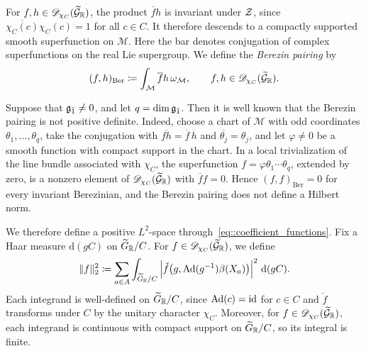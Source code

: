 For $f,h\in\mathscr D_{\chi_C}(\widetilde{{\mathcal{G}}}_{{\mathbb R}})$,
the product $\overline f h$ is invariant under ${\mathcal{Z}}$, since
$
\overline{\chi_C(c)}\chi_C(c)=1$ for all $c\in C$.
It therefore descends to a compactly supported smooth
superfunction on $\mathcal M$. Here the bar denotes conjugation
of complex superfunctions on the real Lie supergroup. We define
the \emph{Berezin pairing} by
\begin{equation}
\label{eq::Berezin_L2_pairing}
(f,h)_{\mathrm{Ber}}
\coloneqq
\int_{\mathcal M}
\overline f h\,\omega_{\mathcal M},
\qquad
f,h\in\mathscr D_{\chi_C}(\widetilde{{\mathcal{G}}}_{{\mathbb R}}).
\end{equation}

Suppose that ${\mathfrak{g}_{\bar{1}}}\neq0$, and let $q=\dim{\mathfrak{g}_{\bar{1}}}$. Then it is well known that the Berezin pairing is not positive definite. Indeed, choose a chart of $\mathcal M$ with odd coordinates $\theta_1,\ldots,\theta_q$, take the conjugation with $\overline{fh}=\overline{f}\,\overline{h}$ and $\overline{\theta_j}=\theta_j$, and let $\varphi\neq0$ be a smooth function with compact support in the chart. In a local trivialization of the line bundle associated with $\chi_C$, the superfunction $f=\varphi\theta_1\cdots\theta_q$, extended by zero, is a nonzero element of $\mathscr D_{\chi_C}(\widetilde{{\mathcal{G}}}_{{\mathbb R}})$ with $\overline{f}f=0$. Hence $(f,f)_{\mathrm{Ber}}=0$ for every invariant Berezinian, and the Berezin pairing does not define a Hilbert norm.

We therefore define a positive $L^2$-space through~\eqref{eq::coefficient_functions}. Fix a Haar measure $\mathrm{d}(gC)$ on $\widetilde{G}_{{\mathbb R}}/C$. For $f\in\mathscr D_{\chi_C}(\widetilde{{\mathcal{G}}}_{{\mathbb R}})$, we define
\begin{equation}
\label{eq::positive_super_L2_right}
\|f\|_2^2
\coloneqq
\sum_{a\in A}
\int_{\widetilde{G}_{{\mathbb R}}/C}
\left|
\check f\bigl(g,\operatorname{Ad}(g^{-1})\beta(X_{a})\bigr)
\right|^2\,\mathrm{d}(gC).
\end{equation}
Each integrand is well-defined on $\widetilde{G}_{{\mathbb R}}/C$, since $\operatorname{Ad}(c)=\operatorname{id}$ for $c\in C$ and $\check f$ transforms under $C$ by the unitary character $\chi_C$. Moreover, 
for $f\in\mathscr D_{\chi_C}(\widetilde{{\mathcal{G}}}_{{\mathbb R}})$, each integrand is continuous with compact support on $\widetilde{G}_{{\mathbb R}}/C$, so its integral is finite.

